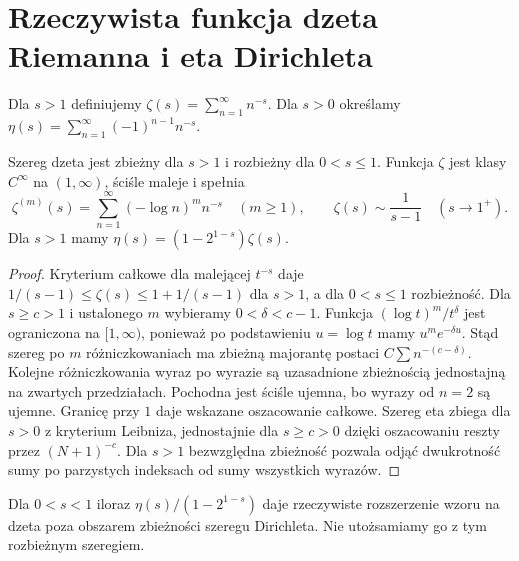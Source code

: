 \section{Rzeczywista funkcja dzeta Riemanna i eta Dirichleta}
\begin{definicja}
\label{ma1:def:zeta-eta-real}
Dla $s>1$ definiujemy $\zeta(s)=\sum_{n=1}^\infty n^{-s}$.
Dla $s>0$ określamy
$\eta(s)=\sum_{n=1}^\infty(-1)^{n-1}n^{-s}$.
\end{definicja}
\begin{twierdzenie}
\label{ma1:thm:zeta-eta-real}
Szereg dzeta jest zbieżny dla $s>1$ i rozbieżny dla
$0<s\le1$. Funkcja $\zeta$ jest klasy $C^\infty$
na $(1,\infty)$, ściśle maleje i spełnia
\[
 \zeta^{(m)}(s)=\sum_{n=1}^\infty(-\log n)^m n^{-s}
 \quad(m\ge1),\qquad
 \zeta(s)\sim\frac1{s-1}\quad(s\to1^+).
\]
Dla $s>1$ mamy $\eta(s)=(1-2^{1-s})\zeta(s)$.
\end{twierdzenie}
\begin{proof}
Kryterium całkowe dla malejącej $t^{-s}$ daje
$1/(s-1)\le\zeta(s)\le1+1/(s-1)$ dla $s>1$,
a dla $0<s\le1$ rozbieżność.
Dla $s\ge c>1$ i ustalonego $m$ wybieramy
$0<\delta<c-1$. Funkcja $(\log t)^m/t^\delta$
jest ograniczona na $[1,\infty)$, ponieważ po
podstawieniu $u=\log t$ mamy $u^me^{-\delta u}$.
Stąd szereg po $m$ różniczkowaniach ma zbieżną
majorantę postaci $C\sum n^{-(c-\delta)}$.
Kolejne różniczkowania wyraz po wyrazie są
uzasadnione zbieżnością jednostajną na zwartych
przedziałach. Pochodna jest ściśle ujemna, bo
wyrazy od $n=2$ są ujemne. Granicę przy $1$ daje
wskazane oszacowanie całkowe.
Szereg eta zbiega dla $s>0$ z kryterium Leibniza,
jednostajnie dla $s\ge c>0$ dzięki oszacowaniu
reszty przez $(N+1)^{-c}$. Dla $s>1$ bezwzględna
zbieżność pozwala odjąć dwukrotność sumy po
parzystych indeksach od sumy wszystkich wyrazów.
\end{proof}
Dla $0<s<1$ iloraz $\eta(s)/(1-2^{1-s})$
daje rzeczywiste rozszerzenie wzoru na dzeta
poza obszarem zbieżności szeregu Dirichleta.
Nie utożsamiamy go z tym rozbieżnym szeregiem.
